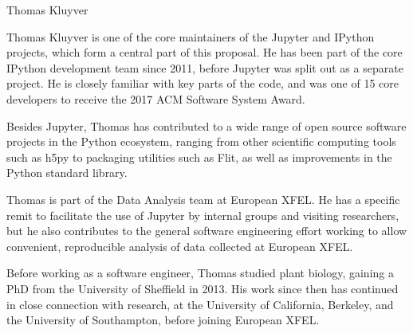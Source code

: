 \begin{participant}[type=R,PM=48,gender=male]{Thomas Kluyver}

  Thomas Kluyver is one of the core maintainers of the Jupyter and IPython
  projects, which form a central part of this proposal.
  He has been part of the core IPython development team since 2011,
  before Jupyter was split out as a separate project.
  He is closely familiar with key parts of the code, and was one of
  15 core developers to receive the 2017 ACM Software System Award.

  Besides Jupyter, Thomas has contributed to a wide range of open source
  software projects in the Python ecosystem, ranging from other scientific
  computing tools such as h5py to packaging utilities such as Flit, as well
  as improvements in the Python standard library.

  Thomas is part of the Data Analysis team at European XFEL.
  He has a specific remit to facilitate the use of Jupyter by internal groups
  and visiting researchers,
  but he also contributes to the general software engineering effort working to
  allow convenient, reproducible analysis of data collected at European XFEL.

  Before working as a software engineer, Thomas studied plant biology, gaining
  a PhD from the University of Sheffield in 2013. His work since then has
  continued in close connection with research, at the University of California,
  Berkeley, and the University of Southampton, before joining European
  XFEL.
\end{participant}

